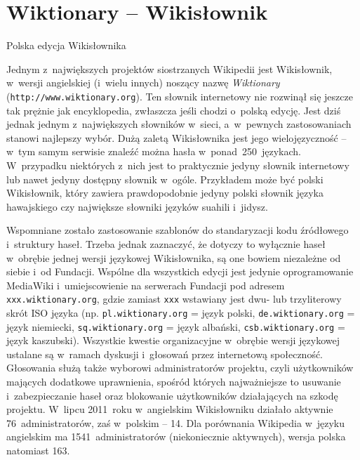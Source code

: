 \documentclass{pracamgr}
\begin{document}
\section{Wiktionary -- Wikisłownik}
\begin{illustration}
	\caption{Polska edycja Wikisłownika}
\end{illustration}
Jednym z~największych projektów siostrzanych Wikipedii jest Wikisłownik, w~wersji angielskiej (i~wielu innych) noszący nazwę \emph{Wiktionary} (\texttt{http://www.wiktionary.org}). Ten słownik internetowy nie rozwinął się jeszcze tak prężnie jak encyklopedia, zwłaszcza jeśli chodzi o~polską edycję. Jest dziś jednak jednym z~największych słowników w~sieci, a~w~pewnych zastosowaniach stanowi najlepszy wybór. Dużą zaletą Wikisłownika jest jego wielojęzyczność -- w~tym samym serwisie znaleźć można hasła w~ponad~250~językach. W~przypadku niektórych z~nich jest to praktycznie jedyny słownik internetowy lub nawet jedyny dostępny słownik w~ogóle. Przykładem może być polski Wikisłownik, który zawiera prawdopodobnie jedyny polski słownik języka hawajskiego czy największe słowniki języków suahili i~jidysz. %

Wspomniane zostało zastosowanie szablonów do standaryzacji kodu źródłowego i~struktury haseł. Trzeba jednak zaznaczyć, że dotyczy to wyłącznie haseł w~obrębie jednej wersji językowej Wikisłownika, są one bowiem niezależne od siebie i~od Fundacji. Wspólne dla wszystkich edycji jest jedynie oprogramowanie MediaWiki i~umiejscowienie na serwerach Fundacji pod adresem \texttt{xxx.wiktionary.org}, gdzie zamiast \texttt{xxx} wstawiany jest dwu- lub trzyliterowy skrót ISO języka (np. \texttt{pl.wiktionary.org} = język polski, \texttt{de.wiktionary.org} = język niemiecki, \texttt{sq.wiktionary.org} = język albański, \texttt{csb.wiktionary.org} = język kaszubski). Wszystkie kwestie organizacyjne w~obrębie wersji językowej ustalane są w~ramach dyskusji i~głosowań przez internetową społeczność. Głosowania służą także wyborowi administratorów projektu, czyli użytkowników mających dodatkowe uprawnienia, spośród których najważniejsze to usuwanie i~zabezpieczanie haseł oraz blokowanie użytkowników działających na szkodę projektu. W~lipcu 2011~roku w~angielskim Wikisłowniku działało aktywnie 76~administratorów, %
zaś w~polskim -- 14. %
Dla porównania Wikipedia w~języku angielskim ma 1541~administratorów (niekoniecznie aktywnych), wersja polska natomiast 163. %
\end{document}
